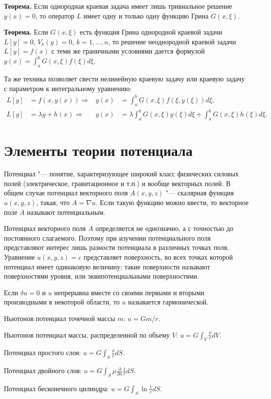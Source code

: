 \documentclass[a4paper,12pt]{article}
\begin{document}
\textbf{Теорема.} Если однородная краевая задача имеет лишь тривиальное решение
$y(x)=0$, то оператор $L$ имеет одну и только одну функцию Грина $G(x,\xi)$.

\textbf{Теорема.} Если $G(x,\xi)$ есть функция Грина однородной краевой задачи
$L[y]=0$, $V_k(y)=0$, $k=1,\dots,n$, то решение неоднородной краевой задачи
$L[y]=f(x)$ с теми же граничными условиями дается формулой
$y(x)=\int_{a}^{b}G(x,\xi)f(\xi)d\xi$.

Та же техника позволяет свести нелинейную краевую задачу
или краевую задачу с параметром к интегральному уравнению:
\begin{align*}
L[y]&=f(x,y(x)) \Rightarrow
    &y(x)&=\int_a^b G(x,\xi)f(\xi,y(\xi))d\xi,\\
L[y]&=\lambda y+h(x) \Rightarrow
    &y(x)&=\lambda\int_a^b G(x,\xi)y(\xi)d\xi+\int_a^b G(x,\xi)h(\xi)d\xi.
\end{align*}


\section{Элементы теории потенциала}

Потенциал "--- понятие, характеризующее широкий класс физических
силовых полей (электрическое, гравитационное и т.п.) и вообще
векторных полей. В общем случае потенциал векторного поля $A(x,y,z)$ "---
скалярная функция $u(x,y,z)$, такая, что $A=\nabla u$. Если такую функцию
можно ввести, то векторное поле $A$ называют потенциальным.

Потенциал векторного поля $A$ определяется не однозначно, а с точностью
до постоянного слагаемого. Поэтому при изучении потенциального поля
представляют интерес лишь разности потенциала в различных точках поля.
Уравнение $u(x,y,z)=c$ представляет поверхность, во всех точках которой
потенциал имеет одинаковую величину; такие поверхности называют
поверхностями уровня, или эквипотенциальными поверхностями.

Если $\delta u=0$ и $u$ непрерывна вместе со своими первыми и вторыми
производными в некоторой области, то $u$ называется гармонической.

Ньютонов потенциал точечной массы $m$: $u=Gm/r$.

Ньютонов потенциал массы, распределенной по объему $V$:
$u=G\int_V\frac{\rho}{r}dV$.

Потенциал простого слоя: $u=G\int_S\frac{\rho}{r}dS$.

Потенциал двойного слоя: $u=G\int_S\mu\frac{\partial}{\partial n}\frac{1}{r}dS$.

Потенциал бесконечного цилиндра: $u=G\int_S\ln\frac{1}{r}dS$.
\end{document}

